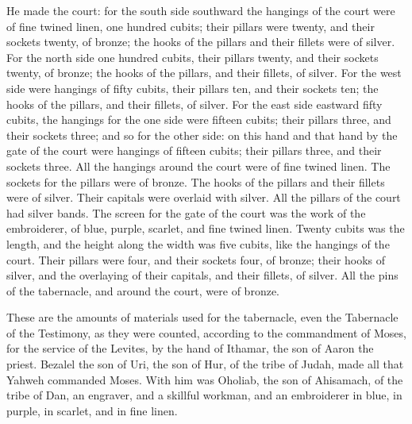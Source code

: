  He made the court: for the south side southward the
hangings of the court were of fine twined linen, one hundred cubits;
 their pillars were twenty, and their sockets twenty, of
bronze; the hooks of the pillars and their fillets were of silver.
 For the north side one hundred cubits, their pillars
twenty, and their sockets twenty, of bronze; the hooks of the pillars,
and their fillets, of silver.  For the west side were
hangings of fifty cubits, their pillars ten, and their sockets ten; the
hooks of the pillars, and their fillets, of silver.  For
the east side eastward fifty cubits,  the hangings for the
one side were fifteen cubits; their pillars three, and their sockets
three;  and so for the other side: on this hand and that
hand by the gate of the court were hangings of fifteen cubits; their
pillars three, and their sockets three.  All the hangings
around the court were of fine twined linen.  The sockets
for the pillars were of bronze. The hooks of the pillars and their
fillets were of silver. Their capitals were overlaid with silver. All
the pillars of the court had silver bands.  The screen for
the gate of the court was the work of the embroiderer, of blue, purple,
scarlet, and fine twined linen. Twenty cubits was the length, and the
height along the width was five cubits, like the hangings of the court.
 Their pillars were four, and their sockets four, of
bronze; their hooks of silver, and the overlaying of their capitals, and
their fillets, of silver.  All the pins of the tabernacle,
and around the court, were of bronze.

 These are the amounts of materials used for the
tabernacle, even the Tabernacle of the Testimony, as they were counted,
according to the commandment of Moses, for the service of the Levites,
by the hand of Ithamar, the son of Aaron the priest. 
Bezalel the son of Uri, the son of Hur, of the tribe of Judah, made all
that Yahweh commanded Moses.  With him was Oholiab, the son
of Ahisamach, of the tribe of Dan, an engraver, and a skillful workman,
and an embroiderer in blue, in purple, in scarlet, and in fine linen.

